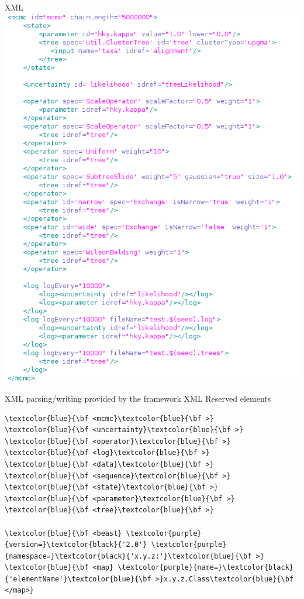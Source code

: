 \documentclass{beamer}
\theoremstyle{definition}
\begin{document}
\begin{frame}{XML}
\includegraphics[width=1.25\textwidth]{xml3.png}
\end{frame}
\begin{frame}[containsverbatim]
XML parsing/writing provided by the framework
{\Large XML}
Reserved elements
\begin{Verbatim}[commandchars=\\\{\}]
\textcolor{blue}{\bf <mcmc}\textcolor{blue}{\bf >}
\textcolor{blue}{\bf <uncertainty}\textcolor{blue}{\bf >}
\textcolor{blue}{\bf <operator}\textcolor{blue}{\bf >}
\textcolor{blue}{\bf <log}\textcolor{blue}{\bf >}
\textcolor{blue}{\bf <data}\textcolor{blue}{\bf >}
\textcolor{blue}{\bf <sequence}\textcolor{blue}{\bf >}
\textcolor{blue}{\bf <state}\textcolor{blue}{\bf >}
\textcolor{blue}{\bf <parameter}\textcolor{blue}{\bf >}
\textcolor{blue}{\bf <tree}\textcolor{blue}{\bf >}

\textcolor{blue}{\bf <beast} \textcolor{purple}{version=}\textcolor{black}{'2.0'} \textcolor{purple}{namespace=}\textcolor{black}{'x.y.z:'}\textcolor{blue}{\bf >}
\textcolor{blue}{\bf <map} \textcolor{purple}{name=}\textcolor{black}{'elementName'}\textcolor{blue}{\bf >}x.y.z.Class\textcolor{blue}{\bf </map>}
\end{Verbatim}
\end{frame}
\end{document}
